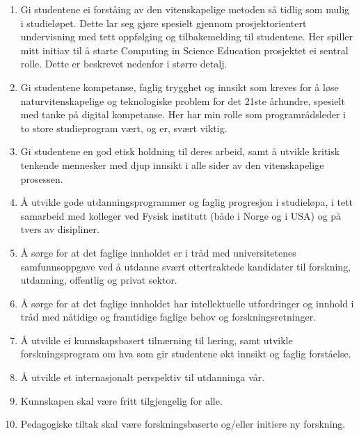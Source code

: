 \documentclass[aps,floatfix,preprint]{revtex4-1}
\begin{document}
\begin{enumerate}
\item Gi studentene ei forståing av den vitenskapelige metoden så tidlig som mulig i studieløpet. Dette lar seg gjøre spesielt gjennom prosjektorientert undervisning med tett oppfølging og tilbakemelding til studentene. Her spiller mitt initiav til å starte Computing in Science Education prosjektet ei sentral rolle. Dette er beskrevet nedenfor i større detalj.  

\item Gi studentene kompetanse, faglig trygghet  og innsikt som kreves for å løse naturvitenskapelige og teknologiske problem for det 21ste århundre, spesielt med tanke på digital kompetanse. Her har min rolle som programrådsleder i to store studieprogram vært, og er, svært viktig. 

\item Gi studentene en god etisk holdning til deres arbeid, samt å utvikle kritisk tenkende mennesker med djup innsikt i alle sider av den vitenskapelige prosessen.

\item Å utvikle gode utdanningsprogrammer og faglig progresjon i studieløpa, i tett samarbeid med kolleger ved Fysisk institutt (både i Norge og i USA) og  på tvers av disipliner.

\item Å sørge for at det faglige innholdet er i tråd med universitetenes samfunnsoppgave ved å utdanne svært ettertraktede kandidater til forskning, utdanning, offentlig og privat sektor.

\item Å sørge for at det faglige innholdet har intellektuelle utfordringer og innhold i tråd med nåtidige og framtidige faglige behov og forskningsretninger. 

\item Å utvikle ei kunnskapsbasert tilnærning til læring, samt utvikle forskningsprogram om hva som gir studentene økt innsikt og faglig forståelse. 

\item Å utvikle et internasjonalt perspektiv til utdanninga vår.

\item Kunnskapen skal være fritt tilgjengelig for alle.

\item Pedagogiske tiltak skal være forskningsbaserte og/eller initiere ny forskning.
  
\end{enumerate}
\end{document}

